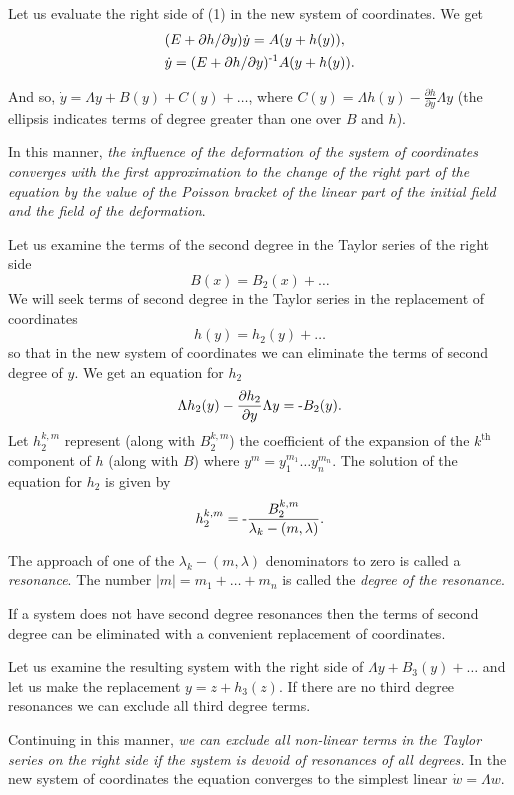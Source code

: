 \documentclass[12pt]{amsart}
\begin{document}
Let us evaluate the right side of (1) in the new system of coordinates.
We get
\begin{align*}
&(E+\partial h/\partial y)\dot y=A(y+h(y)),\\
&\dot y=(E+\partial h/\partial y)^{\text-1}A(y+h(y)).
\end{align*}

And so, $\dot y=\Lambda y+B(y)+C(y)+\dots$, where
$C(y)=\Lambda h(y)-\frac{\partial h}{\partial y}\Lambda y$ (the ellipsis
indicates terms of degree greater than one over $B$ and $h$).

In this manner, \textit{the influence of the deformation of the system of
coordinates converges with the first approximation to the change of the right
part of the equation by the value of the Poisson bracket of the linear part of
the initial field and the field of the deformation}.

Let us examine the terms of the second degree in the Taylor series of the right
side
$$B(x)=B_2(x)+\dots$$
We will seek terms of second degree in the Taylor series in the replacement of
coordinates
$$h(y)=h_2(y)+\dots$$
so that in the new system of coordinates we can eliminate the terms of second
degree of $y$.
We get an equation for $h_2$
$$\Lambda h_2(y)-\frac{\partial h_2}{\partial y}\Lambda y=\text-B_2(y).$$
Let $h_2^{k,m}$ represent (along with $B_2^{k,m}$) the coefficient of the
expansion of the $k^\text{th}$ component of $h$ (along with $B$) where
$y^m=y_1^{m_1}\dots y_n^{m_n}$.
The solution of the equation for $h_2$ is given by
$$h_2^{k,m}=\text-\frac{B_2^{k,m}}{\lambda_k-(m,\lambda)}.$$

The approach of one of the $\lambda_k-(m,\lambda)$ denominators to zero is
called a \textit{resonance}.
The number $|m|=m_1+\dots+m_n$ is called the \textit{degree of the resonance}.

If a system does not have second degree resonances then the terms of second
degree can be eliminated with a convenient replacement of coordinates.

Let us examine the resulting system with the right side of
$\Lambda y+B_3(y)+\dots$ and let us make the replacement $y=z+h_3(z)$.
If there are no third degree resonances we can exclude all third degree terms.

Continuing in this manner, \textit{we can exclude all non-linear terms in the
Taylor series on the right side if the system is devoid of resonances of all
degrees.}
In the new system of coordinates the equation converges to the simplest linear
$\dot w=\Lambda w$.
\end{document}
